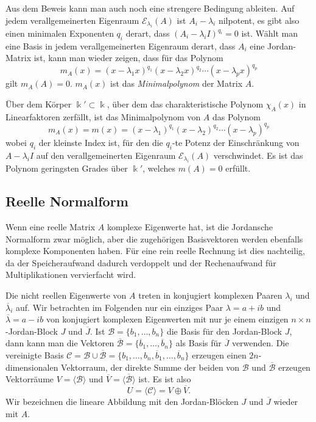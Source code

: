 Aus dem Beweis kann man auch noch eine strengere Bedingung ableiten.
Auf jedem verallgemeinerten Eigenraum $\mathcal{E}_{\lambda_i}(A)$
ist $A_i-\lambda_i$ nilpotent, es gibt also einen minimalen Exponenten
$q_i$ derart, dass $(A_i-\lambda_iI)^{q_i}=0$ ist.
Wählt man eine Basis in jedem verallgemeinerten Eigenraum derart,
dass $A_i$ eine Jordan-Matrix ist, kann man wieder zeigen, dass
für das Polynom
\[
m_A(x)
=
(x-\lambda_1x)^{q_1}
(x-\lambda_2x)^{q_2}
\cdots
(x-\lambda_px)^{q_p}
\]
gilt $m_A(A)=0$.
$m_A(x)$ ist das {\em Minimalpolynom} der Matrix $A$.
%

\begin{satz}[Minimalpolynom]
Über dem Körper $\Bbbk'\subset\Bbbk$, über dem das charakteristische
Polynom $\chi_A(x)$ in Linearfaktoren zerfällt, ist das Minimalpolynom
von $A$ das Polynom
\[
m_A(x)
=
m(x)
=
(x-\lambda_1)^{q_1}
(x-\lambda_2)^{q_2}
\cdots
(x-\lambda_p)^{q_p}
\]
wobei $q_i$ der kleinste Index ist, für den die $q_i$-te Potenz
der Einschränkung von $A-\lambda_i I$ auf den verallgemeinerten Eigenraum
$\mathcal{E}_{\lambda_i}(A)$ verschwindet.
Es ist das Polynom geringsten Grades über $\Bbbk'$, welches $m(A)=0$ erfüllt.
\end{satz}


\subsection{Reelle Normalform
\label{buch:subsection:reelle-normalform}}
Wenn eine reelle Matrix $A$ komplexe Eigenwerte hat, ist die Jordansche
Normalform zwar möglich, aber die zugehörigen Basisvektoren werden ebenfalls
komplexe Komponenten haben.
Für eine rein reelle Rechnung ist dies nachteilig, da der Speicheraufwand
dadurch verdoppelt und der Rechenaufwand für Multiplikationen vervierfacht
wird.

Die nicht reellen Eigenwerte von $A$ treten in konjugiert komplexen Paaren
$\lambda_i$ und $\overline{\lambda}_i$ auf.
Wir betrachten im Folgenden nur ein einziges Paar $\lambda=a+ib$ und
$\overline{\lambda}=a-ib$ von konjugiert komplexen Eigenwerten mit
nur je einem einzigen $n\times n$-Jordan-Block $J$ und $\overline{J}$.
Ist $\mathcal{B}=\{b_1,\dots,b_n\}$ die Basis für den Jordan-Block $J$,
dann kann man die Vektoren
$\overline{\mathcal{B}}=\{\overline{b}_1,\dots,\overline{b}_n\}$ als Basis für
$\overline{J}$ verwenden.
Die vereinigte Basis
$\mathcal{C} = \mathcal{B}\cup\overline{\mathcal{B}}
= \{b_1,\dots,b_n,\overline{b}_1,\dots,\overline{b}_n\}$
erzeugen einen $2n$-dimensionalen Vektorraum,
der direkte Summe der beiden von $\mathcal{B}$ und $\overline{\mathcal{B}}$
erzeugen Vektorräume $V=\langle\mathcal{B}\rangle$ und
$\overline{V}=\langle\overline{\mathcal{B}}\rangle$ ist.
Es ist also
\[
U=\langle \mathcal{C}\rangle
=
V\oplus \overline{V}.
\]
Wir bezeichnen die lineare Abbildung mit den Jordan-Blöcken
$J$ und $\overline{J}$ wieder mit $A$.

